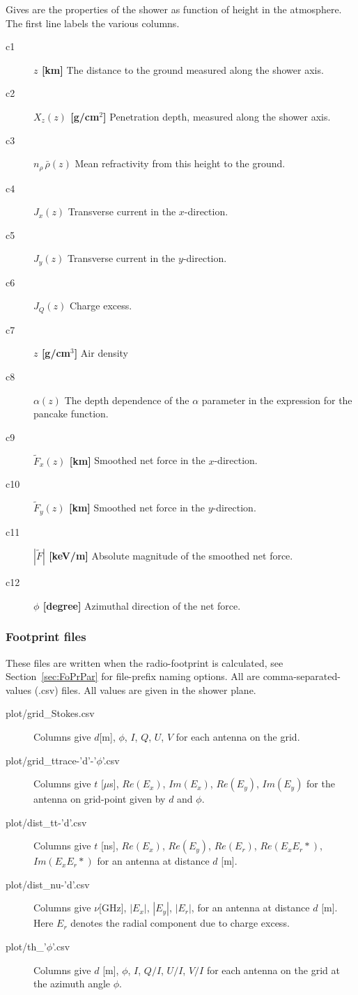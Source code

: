 \documentclass[pdftex,dvipsnames,usenames,fleqn,12pt]{article}
\newcommand*{\secref}[1]{Section~\ref{sec:#1}}
\newcommand*{\seclab}[1]{\label{sec:#1}}
\begin{document}
Gives are the properties of the shower as function of height in the atmosphere. The first line labels the various columns.
\begin{description}
\item[c1] {\bf $z$ [km]} The distance to the ground measured along the shower axis.
\item[c2] {\bf $X_z(z)$ [g/cm$^2$]} Penetration depth, measured along the shower axis.
\item[c3] {\bf $n_\rho\,\bar{\rho}(z)$ } Mean refractivity from this height to the ground.
\item[c4] {\bf $J_x(z)$ } Transverse current in the $x$-direction.
\item[c5] {\bf $J_y(z)$ } Transverse current in the $y$-direction.
\item[c6] {\bf $J_Q(z)$ } Charge excess.
\item[c7] {\bf $z$ [g/cm$^3$]} Air density
\item[c8] {\bf $\alpha(z)$ } The depth dependence of the $\alpha$ parameter in the expression for the pancake function.
\item[c9] {\bf $\tilde{F}_x(z)$ [km]} Smoothed net force in the $x$-direction.
\item[c10] {\bf $\tilde{F}_y(z)$ [km]} Smoothed net force in the $y$-direction.
\item[c11] {\bf $|\tilde{F}| $ [keV/m]} Absolute magnitude of the smoothed net force.
\item[c12] {\bf $\phi$ [degree]} Azimuthal direction of the net force.
\end{description}

\subsubsection{Footprint files}\seclab{GrOpFi}

These files are written when the radio-footprint is calculated, see \secref{FoPrPar} for file-prefix naming options. All are comma-separated-values (.csv) files. All values are given in the shower plane.
\begin{description}
\item[plot/grid\_Stokes.csv] Columns give $d$[m], $\phi$, $I$, $Q$, $U$, $V$ for each antenna on the grid.
\item[plot/grid\_ttrace-'d'-'$\phi$'.csv] Columns give $t$ [$\mu$s], $Re(E_x)$, $Im(E_x)$, $Re(E_y)$, $Im(E_y)$ for the antenna on grid-point given by $d$ and $\phi$.
\item[plot/dist\_tt-'d'.csv] Columns give $t$ [ns], $Re(E_x)$, $Re(E_y)$, $Re(E_r)$, $Re(E_x E_r*)$, $Im(E_x E_r*)$ for an antenna at distance $d$ [m].
\item[plot/dist\_nu-'d'.csv] Columns give $\nu$[GHz], $|E_x|$, $|E_y|$, $|E_r|$, for an antenna at distance $d$ [m]. Here $E_r$ denotes the radial component due to charge excess.
\item[plot/th\_'$\phi$'.csv] Columns give $d$ [m], $\phi$, $I$, $Q/I$, $U/I$, $V/I$ for each antenna on the grid at the azimuth angle $\phi$.
\end{description}
\end{document}
